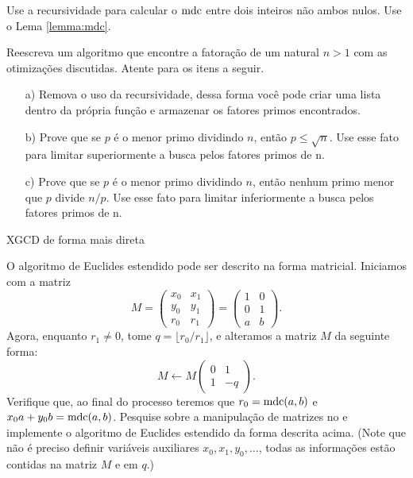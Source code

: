 \begin{exercise} 
  Use a recursividade para calcular o $\operatorname{mdc}$ entre dois inteiros
  não ambos nulos. Use o Lema \ref{lemma:mdc}.
\end{exercise}

\begin{exercise}
  \label{ex:fatoracaoprimos}
  Reescreva um algoritmo que encontre a fatoração
  de um natural $n>1$ com as otimizações discutidas. Atente
  para os itens a seguir.
  \begin{itemize}
    \item[a)] Remova o uso da recursividade, dessa forma você
    pode criar uma lista  dentro da própria função
    e armazenar os fatores primos encontrados.
    \item[b)] Prove que se $p$ é o menor primo dividindo
    $n$, então $p \leq \sqrt{n}$. Use esse fato para limitar superiormente
    a busca pelos fatores primos de n.
    \item[c)] Prove que se $p$ é o menor primo dividindo $n$,
    então nenhum primo menor que $p$ divide $n/p$.  Use esse
    fato para limitar inferiormente a busca pelos fatores primos de n.
  \end{itemize}
\end{exercise}

\begin{exercise}
  XGCD de forma mais direta 
\end{exercise}

\begin{exercise}
  O algoritmo de Euclides estendido pode ser descrito na forma
  matricial. Iniciamos com a matriz
  $$M = \begin{pmatrix}
    x_0 & x_1 \\
    y_0 & y_1 \\
    r_0 & r_1
  \end{pmatrix}
  = \begin{pmatrix}
    1 & 0 \\
    0 & 1 \\
    a & b
  \end{pmatrix}.
  $$
  Agora, enquanto $r_1 \neq 0$, tome $q = \lfloor r_0/r_1\rfloor$,
  e alteramos a matriz $M$ da seguinte forma:
  $$
    M \longleftarrow M 
    \begin{pmatrix}
      0 & 1 \\
      1 & -q
    \end{pmatrix}.
  $$
  Verifique que, ao final do processo teremos que $r_0 = \operatorname{mdc}(a,b)$ e
  $x_0a+y_0b = \operatorname{mdc}(a,b)$. 
  Pesquise sobre a manipulação de matrizes no \sage e implemente
  o algoritmo de Euclides estendido da forma descrita acima. (Note que não
  é preciso definir variáveis auxiliares $x_0,x_1,y_0,\dots$, todas as informações
  estão contidas na matriz $M$ e em $q$.)
\end{exercise}

